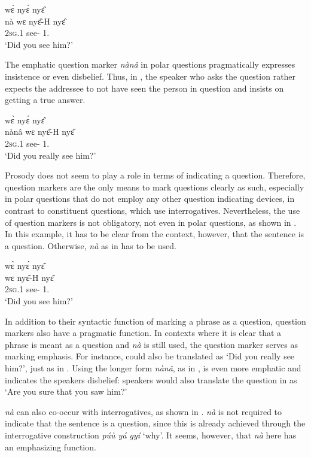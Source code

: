 \ea\label{PQ1}
  wɛ̀ nyɛ́ nyɛ̂  \\
            nà wɛ nyɛ̂-H nyɛ̂ \\
             {\Q} 2\textsc{sg}.{\PST}1 see-{\R} 1.{\OBJ}  \\
    \trans `Did you see him?'
\z

The emphatic question marker {\itshape nànâ} in polar questions pragmatically expresses insistence or even disbelief. Thus, in , the speaker who asks the question rather expects the addressee to not have seen the person in question and insists on getting a true answer.

\ea\label{PQ2}
   wɛ̀ nyɛ́ nyɛ̂ \\
            nànâ wɛ nyɛ̂-H nyɛ̂ \\
             {\Q} 2\textsc{sg}.{\PST}1 see-{\R} 1.{\OBJ} \\
    \trans `Did you really see him?'
\z

Prosody does not seem to play a role in terms of indicating a question. Therefore, question markers are the only means to mark questions clearly as such, especially in polar questions that do not employ any other question indicating devices, in contrast to constituent questions, which use interrogatives. Nevertheless, the use of question markers is not obligatory, not even in polar questions, as shown in . In this example, it has to be clear from the context, however, that the sentence is a question. Otherwise, {\itshape nà} as in  has to be used.

\ea\label{PQ3}
  \glll     wɛ̀ nyɛ́ nyɛ̂ \\
             wɛ nyɛ̂-H nyɛ̂ \\
               2\textsc{sg}.{\PST}1 see-{\R} 1.{\OBJ} \\
    \trans `Did you see him?'
\z

In addition to their syntactic function of marking a phrase as a question, question markers also have a pragmatic function. In contexts where it is clear that a phrase is meant as a question and {\itshape nà} is still used, the question marker serves as marking emphasis. For instance,  could also be translated as `Did you really see him?', just as in . Using the longer form {\itshape nànâ}, as in , is even more emphatic and indicates the speakers disbelief: speakers would also translate the question in  as `Are you sure that you saw him?'

 {\itshape nà} can also co-occur with interrogatives, as shown in . {\itshape nà} is not required to indicate that the sentence is a question, since this is already achieved through the interrogative construction {\itshape púù yá gyí} `why'. It seems, however, that {\itshape nà} here has an emphasizing function.

